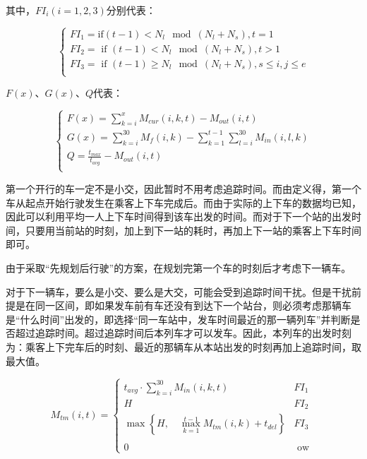 其中，$FI_i(i=1,2,3)$分别代表：

\begin{equation*}
    \begin{cases}
        FI_1 = \text{if}(t-1)<N_l\mod(N_l+N_s), t = 1  \\
        FI_2 = \text{ if } (t - 1) < N_l \mod (N_l + N_s), t > 1    \\
        FI_3 = \text{ if } (t - 1) \geq N_l \mod (N_l + N_s), s \leq i, j \leq e \\
    \end{cases}
\end{equation*}

$F(x)$、$G(x)$、$Q$代表：

\begin{equation*}
    \begin{cases}
        F(x) = \sum _{k = i} ^{x} M_{cur}(i, k, t) - M_{out}(i, t)  \\
        G(x) = \sum _{k = i} ^{30} M_f(i, k) - \sum _{k = 1} ^{t - 1} \sum _{l = i} ^{30} M_{in}(i, l, k)   \\
        Q = \frac {t_{max}} {t_{avg}} - M_{out}(i, t)   \\
    \end{cases}
\end{equation*}


第一个开行的车一定不是小交，因此暂时不用考虑追踪时间。而由定义得，第一个车从起点开始行驶发生在乘客上下车完成后。而由于实际的上下车的数据均已知，因此可以利用平均一人上下车时间得到该车出发的时间。而对于下一个站的出发时间，只要用当前站的时刻，加上到下一站的耗时，再加上下一站的乘客上下车时间即可。

由于采取“先规划后行驶”的方案，在规划完第一个车的时刻后才考虑下一辆车。

对于下一辆车，要么是小交、要么是大交，可能会受到追踪时间干扰。但是干扰前提是在同一区间，即如果发车前有车还没有到达下一个站台，则必须考虑那辆车是“什么时间”出发的，即选择“同一车站中，发车时间最近的那一辆列车”并判断是否超过追踪时间。超过追踪时间后本列车才可以发车。因此，本列车的出发时刻为：乘客上下完车后的时刻、最近的那辆车从本站出发的时刻再加上追踪时间，取最大值。

\begin{equation}
M_{tm}(i, t) = 
	\begin{cases}
		t_{avg} \cdot \sum _{k = i} ^{30} M_{in}(i, k, t) &  FI_1\\
		H & FI_2\\
		\max \left\{ 
			H, \quad
			\max _{k = 1} ^{t - 1}M_{tm}(i, k) + t_{del}
		\right\} & FI_3\\
		 \\
		0 & \text{ ow }
	\end{cases}
\end{equation}

